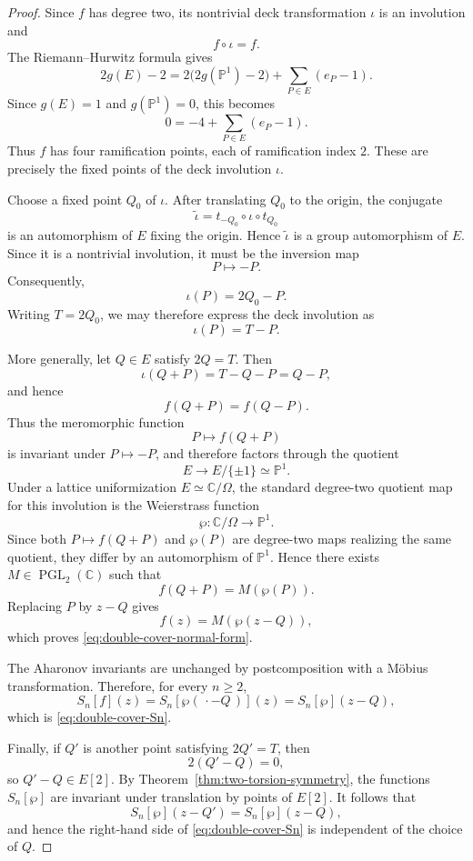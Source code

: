 \documentclass[11pt]{amsart}
\theoremstyle{definition}
\theoremstyle{remark}
\numberwithin{equation}{section}
\begin{document}
\begin{proof}
Since \(f\) has degree two, its nontrivial deck transformation
\(\iota\) is an involution and
\[
f\circ\iota=f.
\]
The Riemann--Hurwitz formula gives
\[
2g(E)-2
=
2\bigl(2g(\mathbb P^1)-2\bigr)
+
\sum_{P\in E}(e_P-1).
\]
Since \(g(E)=1\) and \(g(\mathbb P^1)=0\), this becomes
\[
0=-4+\sum_{P\in E}(e_P-1).
\]
Thus \(f\) has four ramification points, each of ramification
index \(2\). These are precisely the fixed points of the deck
involution \(\iota\).

Choose a fixed point \(Q_0\) of \(\iota\). After translating \(Q_0\)
to the origin, the conjugate
\[
\widetilde{\iota}
=
t_{-Q_0}\circ\iota\circ t_{Q_0}
\]
is an automorphism of \(E\) fixing the origin. Hence
\(\widetilde{\iota}\) is a group automorphism of \(E\). Since it is
a nontrivial involution, it must be the inversion map
\[
P\longmapsto -P.
\]
Consequently,
\[
\iota(P)=2Q_0-P.
\]
Writing \(T=2Q_0\), we may therefore express the deck involution as
\[
\iota(P)=T-P.
\]

More generally, let \(Q\in E\) satisfy \(2Q=T\). Then
\[
\iota(Q+P)
=
T-Q-P
=
Q-P,
\]
and hence
\[
f(Q+P)=f(Q-P).
\]
Thus the meromorphic function
\[
P\longmapsto f(Q+P)
\]
is invariant under \(P\mapsto -P\), and therefore factors through
the quotient
\[
E\longrightarrow E/\{\pm1\}\simeq\mathbb P^1.
\]
Under a lattice uniformization \(E\simeq\mathbb C/\Omega\), the
standard degree-two quotient map for this involution is the
Weierstrass function
\[
\wp:\mathbb C/\Omega\longrightarrow\mathbb P^1.
\]
Since both \(P\mapsto f(Q+P)\) and \(\wp(P)\) are degree-two maps
realizing the same quotient, they differ by an automorphism of
\(\mathbb P^1\). Hence there exists
\(M\in\operatorname{PGL}_2(\mathbb C)\) such that
\[
f(Q+P)=M(\wp(P)).
\]
Replacing \(P\) by \(z-Q\) gives
\[
f(z)=M(\wp(z-Q)),
\]
which proves \eqref{eq:double-cover-normal-form}.

The Aharonov invariants are unchanged by postcomposition with a
Möbius transformation. Therefore, for every \(n\geq2\),
\[
S_n[f](z)
=
S_n[\wp(\,\cdot-Q\,)](z)
=
S_n[\wp](z-Q),
\]
which is \eqref{eq:double-cover-Sn}.

Finally, if \(Q'\) is another point satisfying \(2Q'=T\), then
\[
2(Q'-Q)=0,
\]
so \(Q'-Q\in E[2]\). By
Theorem~\ref{thm:two-torsion-symmetry}, the functions
\(S_n[\wp]\) are invariant under translation by points of \(E[2]\).
It follows that
\[
S_n[\wp](z-Q')
=
S_n[\wp](z-Q),
\]
and hence the right-hand side of \eqref{eq:double-cover-Sn} is
independent of the choice of \(Q\).
\end{proof}
\end{document}
